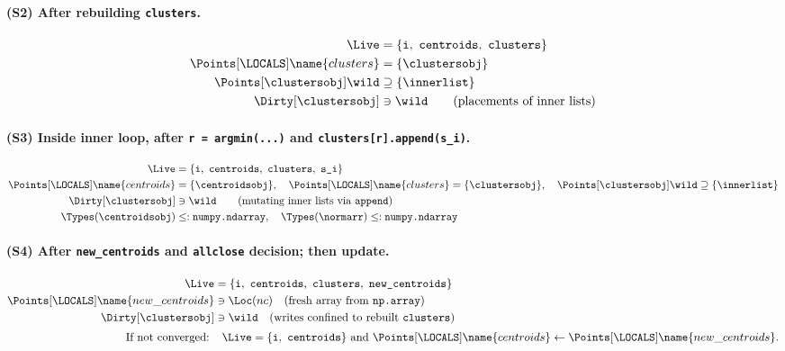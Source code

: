 \paragraph{(S2) After rebuilding \texttt{clusters}.}
\begin{align*}
\Live &= \{\texttt{i},\ \texttt{centroids},\ \texttt{clusters}\}\\
\Points[\LOCALS]\name{clusters} &= \{\clustersobj\}\\
\Points[\clustersobj]\wild &\supseteq \{\innerlist\}\\
\Dirty[\clustersobj] &\ni \wild\qquad\text{(placements of inner lists)}
\end{align*}

\paragraph{(S3) Inside inner loop, after \texttt{r = argmin(...)} and \texttt{clusters[r].append(s\_i)}.}
\begin{align*}
\Live &= \{\texttt{i},\ \texttt{centroids},\ \texttt{clusters},\ \texttt{s\_i}\}\\
\Points[\LOCALS]\name{centroids} &= \{\centroidsobj\},\quad
\Points[\LOCALS]\name{clusters} = \{\clustersobj\},\quad
\Points[\clustersobj]\wild \supseteq \{\innerlist\}\\
\Dirty[\clustersobj] &\ni \wild\qquad\text{(mutating inner lists via \texttt{append})}\\
\Types(\centroidsobj) &\le : \texttt{numpy.ndarray},\quad \Types(\normarr)\le:\texttt{numpy.ndarray}
\end{align*}

\paragraph{(S4) After \texttt{new\_centroids} and \texttt{allclose} decision; then update.}
\begin{align*}
\Live &= \{\texttt{i},\ \texttt{centroids},\ \texttt{clusters},\ \texttt{new\_centroids}\}\\
\Points[\LOCALS]\name{new\_centroids} &\ni \Loc(nc) \quad\text{(fresh array from \texttt{np.array})}\\
\Dirty[\clustersobj] &\ni \wild\quad\text{(writes confined to rebuilt \texttt{clusters})}\\[0.25em]
\text{If not converged: }&\ \ \Live=\{\texttt{i},\ \texttt{centroids}\}\ \text{and}\
\Points[\LOCALS]\name{centroids} \leftarrow \Points[\LOCALS]\name{new\_centroids}.
\end{align*}

